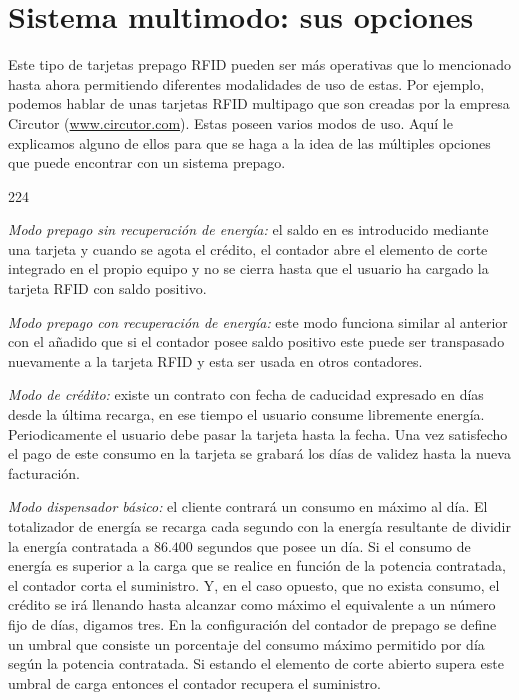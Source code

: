 \section{Sistema multimodo: sus opciones}
Este tipo de tarjetas prepago RFID pueden ser más operativas que lo mencionado hasta ahora permitiendo diferentes modalidades de uso de estas. Por ejemplo, podemos hablar de unas tarjetas RFID multipago que son creadas por la empresa Circutor (\url{www.circutor.com}). Estas poseen varios modos de uso. Aquí le explicamos alguno de ellos para que se haga a la idea de las múltiples opciones que puede encontrar con un sistema prepago.
\begin{dinglist}{224}
\item \textsl{Modo prepago sin recuperación de energía:} el saldo en \kilowatthour \: es introducido mediante una tarjeta y cuando se agota el crédito, el contador abre el elemento de corte integrado en el propio equipo y no se cierra hasta que el usuario ha cargado la tarjeta RFID con saldo positivo.
\item \textsl{Modo prepago con recuperación de energía:} este modo funciona similar al anterior con el añadido que si el contador posee saldo positivo este puede ser transpasado nuevamente a la tarjeta RFID y esta ser usada en otros contadores. 
\item \textsl{Modo de crédito:} existe un contrato con fecha de caducidad expresado en días desde la última recarga, en ese tiempo el usuario consume libremente energía. Periodicamente el usuario debe pasar la tarjeta hasta la fecha. Una vez satisfecho el pago de este consumo en la tarjeta se grabará los días de validez hasta la nueva facturación.
\item \textsl{Modo dispensador básico:} el cliente contrará un consumo en \kilowatthour \: máximo al día. El totalizador de energía se recarga cada segundo con la energía resultante de dividir la energía contratada a $86.400$ segundos que posee un día. Si el consumo de energía es superior a la carga que se realice en función de la potencia contratada, el contador corta el suministro. Y, en el caso opuesto, que no exista consumo, el crédito se irá llenando hasta alcanzar como máximo el equivalente a un número fijo de días, digamos tres. En la configuración del contador de prepago se define un umbral que consiste un porcentaje del consumo máximo permitido por día según la potencia contratada. Si estando el elemento de corte abierto supera este umbral de carga entonces el contador recupera el suministro.
\end{dinglist}

